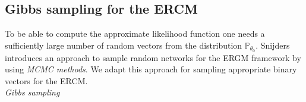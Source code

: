 \documentclass[headsepline=true, abstracton]{scrartcl}
\begin{document}
\subsection*{Gibbs sampling for the ERCM}
To be able to compute the approximate likelihood function one needs a sufficiently large number of random vectors from the distribution $\mathbb{P}_{\theta_0}$. Snijders \citet{Snijders.2002b} introduces an approach to sample random networks for the ERGM framework by using \textit{MCMC methods}. We adapt this approach for sampling appropriate binary vectors for the ERCM. \\[0.4cm]
\textit{Gibbs sampling}\\
\end{document}
